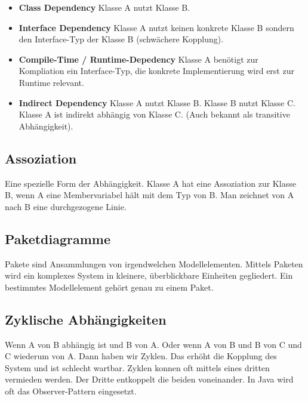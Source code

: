 \begin{itemize}
	\item \textbf{Class Dependency} Klasse A nutzt Klasse B.
	\item \textbf{Interface Dependency} Klasse A nutzt keinen konkrete Klasse B sondern den Interface-Typ der Klasse B (schwächere Kopplung).
	\item \textbf{Compile-Time / Runtime-Depedency} Klasse A benötigt zur Kompliation ein Interface-Typ, die konkrete Implementierung wird erst zur Runtime relevant.
	\item \textbf{Indirect Dependency} Klasse A nutzt Klasse B. Klasse B nutzt Klasse C. Klasse A ist indirekt abhängig von Klasse C. (Auch bekannt als transitive Abhängigkeit).
\end{itemize}

\subsection{Assoziation}
Eine spezielle Form der Abhängigkeit. Klasse A hat eine Assoziation zur Klasse B, wenn A eine Membervariabel hält mit dem Typ von B. Man zeichnet von A nach B eine durchgezogene Linie.

\subsection{Paketdiagramme}
Pakete sind Ansammlungen von irgendwelchen Modellelementen. Mittels Paketen wird ein komplexes System in kleinere, überblickbare Einheiten gegliedert. Ein bestimmtes Modellelement gehört genau zu einem Paket.

\subsection{Zyklische Abhängigkeiten}
Wenn A von B abhängig ist und B von A. Oder wenn A von B und B von C und C wiederum von A. Dann haben wir Zyklen. Das erhöht die Kopplung des System und ist schlecht wartbar. Zyklen konnen oft mittels eines dritten vermieden werden. Der Dritte entkoppelt die beiden voneinander. In Java wird oft das Observer-Pattern eingesetzt.

